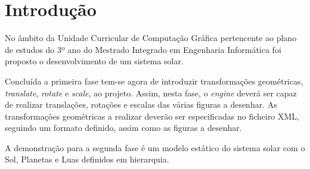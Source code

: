 \chapter{Introdução}
\label{cap:intro}

No âmbito da Unidade Curricular de Computação Gráfica pertencente ao plano de estudos do 3º ano do Mestrado Integrado em Engenharia Informática foi proposto o desenvolvimento de um sistema solar. 

Concluída a primeira fase tem-se agora de introduzir transformações geométricas, \textit{translate}, \textit{rotate} e \textit{scale}, ao projeto. Assim, nesta fase, o \textit{engine} deverá ser capaz de realizar translações, rotações e escalas das várias figuras a desenhar.
As transformações geométricas a realizar deverão ser especificadas no ficheiro XML, seguindo um formato definido, assim como as figuras a desenhar.

A demonstração para a segunda fase é um modelo estático do sistema solar com o Sol, Planetas e Luas definidos em hierarquia.
